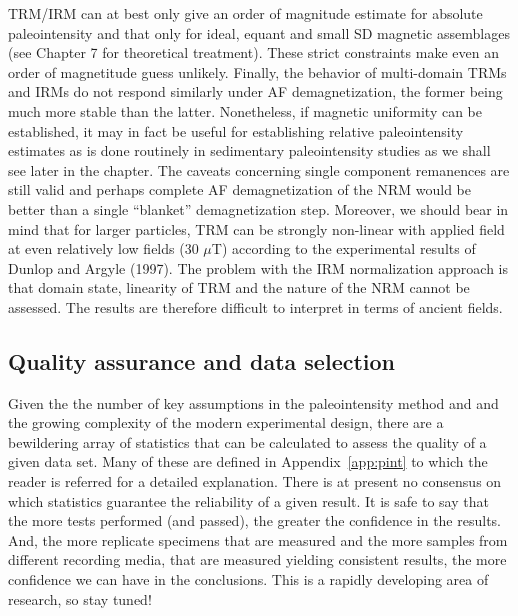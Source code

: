 TRM/IRM can   at best only give  an order of magnitude estimate for absolute paleointensity and that only for ideal, equant and small SD magnetic assemblages (see Chapter 7 for theoretical treatment).  These strict constraints make even an order of magnetitude guess unlikely.  Finally, the behavior of multi-domain TRMs and IRMs do not respond similarly under AF demagnetization, the former  being much more stable than the latter.     Nonetheless, if magnetic uniformity can be established, it may in fact be useful for establishing relative paleointensity estimates as is done routinely in sedimentary paleointensity studies as we shall see later in the chapter.  The caveats concerning  single component remanences  are still valid and perhaps complete AF demagnetization of the NRM would be better than a single ``blanket'' demagnetization step.   Moreover,  we should bear in mind that for larger particles, TRM can be  strongly non-linear with applied field at even relatively low fields (30 $\mu$T) according to the experimental results of
\nocite{dunlop97b}
Dunlop and Argyle (1997).   The problem with the IRM normalization approach is that domain state, linearity of TRM and the  nature of the NRM cannot be assessed.  The results are therefore difficult to interpret in terms of ancient fields.  

\subsection{Quality assurance and data selection}

Given the the number of key assumptions in the paleointensity method and and the growing complexity of the modern experimental design, there are a bewildering array of statistics that can be calculated to assess the quality of a given data set.    Many of these are defined in Appendix~\ref{app:pint} to which the reader is referred for a detailed explanation.    There is at present no consensus on which statistics guarantee the reliability of a given result.    It is safe to say that the more tests performed (and passed), the greater the confidence in the results.  And, the more replicate specimens  that are measured and the more samples from different recording media,  that are measured yielding consistent results, the more confidence we can have in the conclusions.  This is a rapidly developing area of research, so stay tuned!





